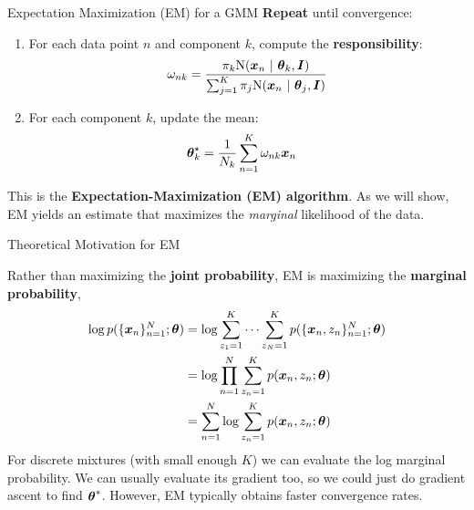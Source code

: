 \documentclass[aspectratio=169]{beamer}
\begin{document}
\begin{frame}[t, allowframebreaks]{Expectation Maximization (EM) for a GMM}\label{maximum-likelihood-estimation-via-em}
\textbf{Repeat} until convergence: 
\begin{enumerate}
    \item For each data point \(n\) and component \(k\), compute the
    \textbf{responsibility}: 
    \begin{align*}
        \omega_{nk} = \frac{\pi_k \mathrm{N}(\boldsymbol{x}_n ~\vert~ \boldsymbol{\theta}_k, \boldsymbol{I})}{\sum_{j=1}^K \pi_j \mathrm{N}(\boldsymbol{x}_n ~\vert~ \boldsymbol{\theta}_j, \boldsymbol{I})}
    \end{align*}

    \item
    For each component \(k\), update the mean: \begin{align*}
       \boldsymbol{\theta}_k^\star &= \frac{1}{N_k} \sum_{n=1}^K \omega_{nk} \boldsymbol{x}_n
    \end{align*}
\end{enumerate}

This is the \textbf{Expectation-Maximization (EM) algorithm}. As we will
show, EM yields an estimate that maximizes the \emph{marginal}
likelihood of the data.
\end{frame}

\begin{frame}[t, allowframebreaks]{Theoretical Motivation for EM}\label{theoretical-motivation}

Rather than maximizing the \textbf{joint probability}, EM is maximizing
the \textbf{marginal probability}, \begin{align*}
    \log p(\{\boldsymbol{x}_n\}_{n=1}^N; \boldsymbol{\theta}) 
    &= \log \sum_{z_1=1}^K \cdots \sum_{z_N=1}^K p(\{\boldsymbol{x}_n, z_n\}_{n=1}^N ; \boldsymbol{\theta}) \\
    &= \log \prod_{n=1}^N \sum_{z_n=1}^K p(\boldsymbol{x}_n, z_n ; \boldsymbol{\theta}) \\
    &= \sum_{n=1}^N  \log \sum_{z_n=1}^K p(\boldsymbol{x}_n, z_n ; \boldsymbol{\theta}) 
\end{align*} For discrete mixtures (with small enough \(K\)) we can
evaluate the log marginal probability. We can usually evaluate its
gradient too, so we could just do gradient ascent to find
\(\boldsymbol{\theta}^*\). However, EM typically obtains faster convergence rates.
\end{frame}
\end{document}
